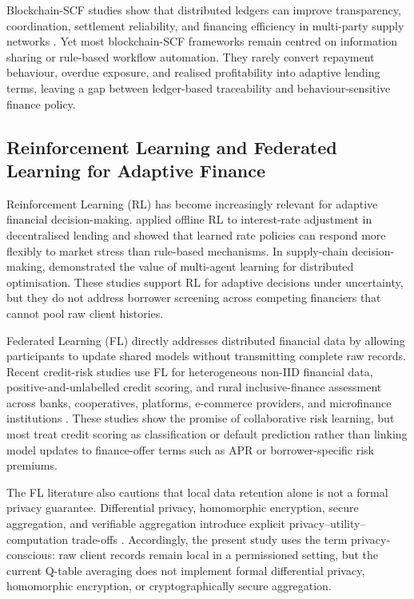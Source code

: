 \documentclass[12pt]{article}
\begin{document}
Blockchain-SCF studies show that distributed ledgers can improve transparency, coordination, settlement reliability, and financing efficiency in multi-party supply networks \citep{li_three-level_2023,hu_acsarf_2025,modgil_blockchain-enabled_2024}. Yet most blockchain-SCF frameworks remain centred on information sharing or rule-based workflow automation. They rarely convert repayment behaviour, overdue exposure, and realised profitability into adaptive lending terms, leaving a gap between ledger-based traceability and behaviour-sensitive finance policy.

\subsection{Reinforcement Learning and Federated Learning for Adaptive Finance}

Reinforcement Learning (RL) has become increasingly relevant for adaptive financial decision-making. \citet{qu2025rules} applied offline RL to interest-rate adjustment in decentralised lending and showed that learned rate policies can respond more flexibly to market stress than rule-based mechanisms. In supply-chain decision-making, \citet{Guo_2025} demonstrated the value of multi-agent learning for distributed optimisation. These studies support RL for adaptive decisions under uncertainty, but they do not address borrower screening across competing financiers that cannot pool raw client histories.

Federated Learning (FL) directly addresses distributed financial data by allowing participants to update shared models without transmitting complete raw records. Recent credit-risk studies use FL for heterogeneous non-IID financial data, positive-and-unlabelled credit scoring, and rural inclusive-finance assessment across banks, cooperatives, platforms, e-commerce providers, and microfinance institutions \citep{li2024dynamicfl,qiu2025hetfedpu,xie2026fedattncredit}. These studies show the promise of collaborative risk learning, but most treat credit scoring as classification or default prediction rather than linking model updates to finance-offer terms such as APR or borrower-specific risk premiums.

The FL literature also cautions that local data retention alone is not a formal privacy guarantee. Differential privacy, homomorphic encryption, secure aggregation, and verifiable aggregation introduce explicit privacy--utility--computation trade-offs \citep{naresh2026privacycredit,wang2025secureaggregation}. Accordingly, the present study uses the term privacy-conscious: raw client records remain local in a permissioned setting, but the current Q-table averaging does not implement formal differential privacy, homomorphic encryption, or cryptographically secure aggregation.
\end{document}
